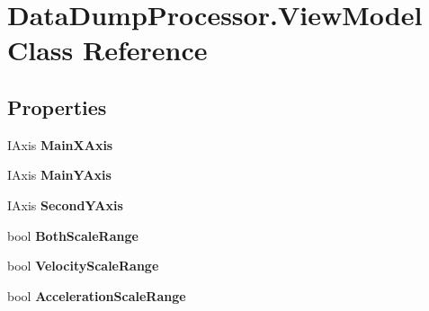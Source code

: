 \hypertarget{class_data_dump_processor_1_1_view_model}{\section{Data\-Dump\-Processor.\-View\-Model Class Reference}
\label{class_data_dump_processor_1_1_view_model}
}
\subsection*{Properties}
\begin{DoxyCompactItemize}
\item 
\hypertarget{class_data_dump_processor_1_1_view_model_a080e43e4f05b754da29e42f41973edc2}{I\-Axis {\bfseries Main\-X\-Axis}}\label{class_data_dump_processor_1_1_view_model_a080e43e4f05b754da29e42f41973edc2}

\item 
\hypertarget{class_data_dump_processor_1_1_view_model_a84635d02073da245808059363ec5a469}{I\-Axis {\bfseries Main\-Y\-Axis}}\label{class_data_dump_processor_1_1_view_model_a84635d02073da245808059363ec5a469}

\item 
\hypertarget{class_data_dump_processor_1_1_view_model_a47a5f44870db7edeb68eeb14e7e19eca}{I\-Axis {\bfseries Second\-Y\-Axis}}\label{class_data_dump_processor_1_1_view_model_a47a5f44870db7edeb68eeb14e7e19eca}

\item 
\hypertarget{class_data_dump_processor_1_1_view_model_a3c180602a6323d50fd9bb21c714a608c}{bool {\bfseries Both\-Scale\-Range}}\label{class_data_dump_processor_1_1_view_model_a3c180602a6323d50fd9bb21c714a608c}

\item 
\hypertarget{class_data_dump_processor_1_1_view_model_a551eb949c7de1ac900693996ab2caadd}{bool {\bfseries Velocity\-Scale\-Range}}\label{class_data_dump_processor_1_1_view_model_a551eb949c7de1ac900693996ab2caadd}

\item 
\hypertarget{class_data_dump_processor_1_1_view_model_ac119cbba583c2b35448017504522a2e6}{bool {\bfseries Acceleration\-Scale\-Range}}\label{class_data_dump_processor_1_1_view_model_ac119cbba583c2b35448017504522a2e6}


\end{DoxyCompactItemize}
